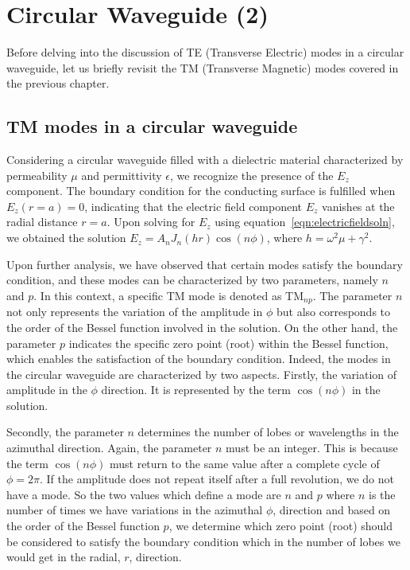 \chapter{Circular Waveguide (2)}\label{lec:lec45}
Before delving into the discussion of TE (Transverse Electric) modes in a circular waveguide, let us briefly revisit the TM (Transverse Magnetic) modes covered in the previous chapter. 

\section{TM modes in a circular waveguide}
Considering a circular waveguide filled with a dielectric material characterized by permeability $\mu$ and permittivity $\epsilon$, we recognize the presence of the $E_z$ component. The boundary condition for the conducting surface is fulfilled when $E_z(r=a) = 0$, indicating that the electric field component $E_z$ vanishes at the radial distance $r=a$. Upon solving for $E_z$ using equation~\eqref{eqn:electricfieldsoln}, we obtained the solution $E_z = A_n J_n(hr)\cos(n\phi)$, where $h = \omega^2\mu + \gamma^2$.

Upon further analysis, we have observed that certain modes satisfy the boundary condition, and these modes can be characterized by two parameters, namely $n$ and $p$. In this context, a specific TM mode is denoted as TM$_{np}$. The parameter $n$ not only represents the variation of the amplitude in $\phi$ but also corresponds to the order of the Bessel function involved in the solution. On the other hand, the parameter $p$ indicates the specific zero point (root) within the Bessel function, which enables the satisfaction of the boundary condition. Indeed, the modes in the circular waveguide are characterized by two aspects. Firstly, the variation of amplitude in the $\phi$ direction. It is represented by the term $\cos(n\phi)$ in the solution.

Secondly, the parameter $n$ determines the number of lobes or wavelengths in the azimuthal direction. Again, the parameter $n$ must be an integer. This is because the term $\cos(n\phi)$ must return to the same value after a complete cycle of $\phi=2\pi$. If the amplitude does not repeat itself after a full revolution, we do not have a mode. So the two values which define a mode are $n$ and $p$ where $n$ is the number of times we have variations in the azimuthal $\phi$, direction and based on the order of the Bessel function $p$, we determine which zero point (root) should be considered to satisfy the boundary condition which in the number of lobes we would get in the radial, $r$, direction.

